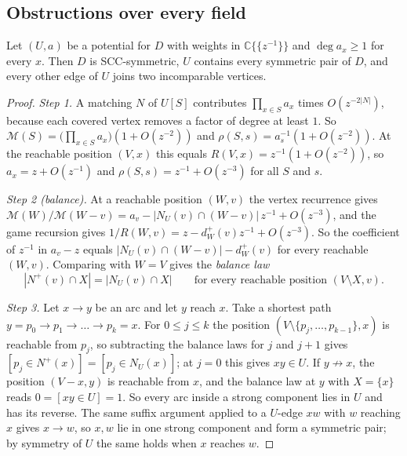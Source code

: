 \documentclass[final]{siamart0516}
\numberwithin{theorem}{section}
\numberwithin{equation}{section}
\theoremstyle{siamnonum}
\theoremstyle{plain}
\newcommand{\CC}{\mathbb{C}}
\newcommand{\Mpot}{\mathcal{M}}           %
\newcommand{\nplus}{N^{+}}
\begin{document}
\subsection{Obstructions over every field}

\begin{theorem}\label{thm:normal}
Let $(U,a)$ be a potential for $D$ with weights in $\CC\{\!\{z^{-1}\}\!\}$ and $\deg a_x\ge1$ for every $x$. Then $D$ is SCC-symmetric, $U$ contains every symmetric pair of $D$, and every other edge of $U$ joins two incomparable vertices.
\end{theorem}
\begin{proof}
\emph{Step 1.} A matching $N$ of $U[S]$ contributes $\prod_{x\in S}a_x$ times $O(z^{-2|N|})$, because each covered vertex removes a factor of degree at least $1$. So $\Mpot(S)=\bigl(\prod_{x\in S}a_x\bigr)(1+O(z^{-2}))$ and $\rho(S,s)=a_s^{-1}(1+O(z^{-2}))$. At the reachable position $(V,x)$ this equals $R(V,x)=z^{-1}(1+O(z^{-2}))$, so $a_x=z+O(z^{-1})$ and $\rho(S,s)=z^{-1}+O(z^{-3})$ for all $S$ and $s$.

\emph{Step 2 (balance).} At a reachable position $(W,v)$ the vertex recurrence gives $\Mpot(W)/\Mpot(W-v)=a_v-|N_U(v)\cap(W-v)|\,z^{-1}+O(z^{-3})$, and the game recursion gives $1/R(W,v)=z-d^{+}_W(v)z^{-1}+O(z^{-3})$. So the coefficient of $z^{-1}$ in $a_v-z$ equals $|N_U(v)\cap(W-v)|-d^{+}_W(v)$ for every reachable $(W,v)$. Comparing with $W=V$ gives the \emph{balance law}
\[
|\nplus(v)\cap X|=|N_U(v)\cap X|\qquad\text{for every reachable position }(V\setminus X,v).
\]

\emph{Step 3.} Let $x\to y$ be an arc and let $y$ reach $x$. Take a shortest path $y=p_0\to p_1\to\dots\to p_k=x$. For $0\le j\le k$ the position $(V\setminus\{p_j,\dots,p_{k-1}\},x)$ is reachable from $p_j$, so subtracting the balance laws for $j$ and $j+1$ gives $[p_j\in\nplus(x)]=[p_j\in N_U(x)]$; at $j=0$ this gives $xy\in U$. If $y\not\to x$, the position $(V-x,y)$ is reachable from $x$, and the balance law at $y$ with $X=\{x\}$ reads $0=[xy\in U]=1$. So every arc inside a strong component lies in $U$ and has its reverse. The same suffix argument applied to a $U$-edge $xw$ with $w$ reaching $x$ gives $x\to w$, so $x,w$ lie in one strong component and form a symmetric pair; by symmetry of $U$ the same holds when $x$ reaches $w$.
\end{proof}
\end{document}
